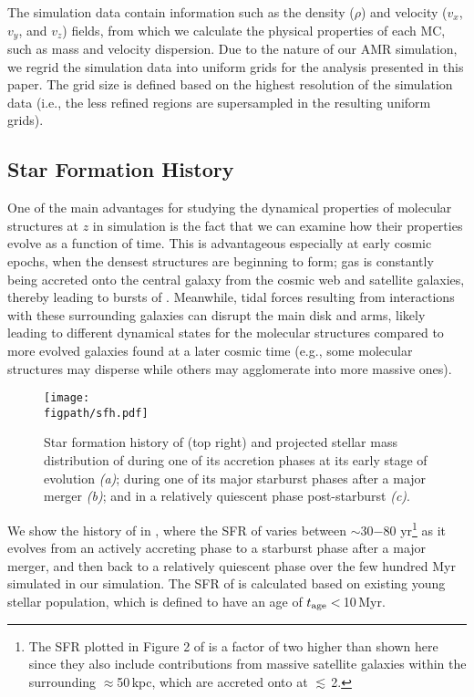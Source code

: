 \IfFileExists{emulateapjlegacy.cls}{\documentclass[iop]{emulateapjlegacy}}{\documentclass[iop]{emulateapj}}
\newcommand{\AP}[1]{({\bf \color{apcolor} AP: #1})}
\newcommand{\DL}[1]{({\bf \color{dlcolor} DL: #1})}
\begin{document}
The simulation data contain information such as the density ($\rho$) and velocity ($v_x$, $v_y$, and $v_z$) fields, from which we calculate 
the physical properties of each MC, such as mass and velocity dispersion.
Due to the nature of our AMR simulation, we regrid the simulation data into uniform grids for the analysis presented in this paper. 
The grid size is defined 
based on the highest resolution of the simulation data (i.e., the less refined regions are supersampled in the resulting uniform grids). 



\subsection{Star Formation History} \label{sec:sfh}
One of the main advantages for studying the dynamical properties of molecular structures at
$z$ in simulation is the fact that we can examine how their properties evolve
as a function of time.
This is advantageous especially at early cosmic epochs,
when the densest structures are beginning to form;
gas is constantly being accreted onto the central galaxy from the cosmic web and
satellite galaxies, thereby leading to bursts of \SF.
Meanwhile, tidal forces resulting from interactions with these surrounding
galaxies can disrupt the main disk and arms, likely leading to different dynamical states
for the molecular structures compared to more evolved galaxies found at 
a later cosmic time (e.g., some molecular structures may disperse while others may agglomerate into more massive
ones). %

\begin{figure*}[!htbp]
\centering
\texttt{[image: \\figpath/sfh.pdf]}
\caption{
	Star formation history of \flower (top right) and
	projected stellar mass distribution of \flower during one of its accretion phases
	at its early stage of evolution {\it (a)}; during one of its major starburst phases
	after a major merger {\it (b)}; and in a relatively quiescent phase post-starburst {\it (c)}.
\label{fig:SFH}}
\end{figure*}


We show the \SF history of \flower in , where
the SFR of \flower varies between $\sim$30$-$80\,\Msun\,yr\pmOne\footnote{
The SFR plotted in Figure 2 of \citet{Pallottini17b}
is a factor of two higher than shown here since they also include contributions from
massive satellite galaxies within the surrounding $\approx$50\,kpc, which
are accreted onto \flower at \z$\lesssim$\,2.}
as it evolves from an actively accreting phase to
a starburst phase after a major merger, and then back to a relatively quiescent phase
over the few hundred Myr simulated in our simulation.
The SFR of \flower is calculated based on existing young stellar population, which is
defined to have an age of $t_{\rm age}<$\,10\,Myr.
\end{document}
